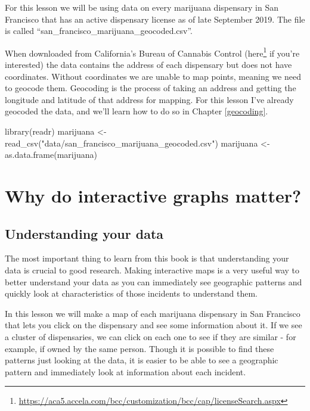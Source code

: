 \documentclass[
  a4paper,
]{krantz}
\makeatletter
\newenvironment{Shaded}{\begin{snugshade}}{\end{snugshade}}
\newcommand{\FunctionTok}[1]{\textcolor[rgb]{0,0,0}{#1}}
\newcommand{\NormalTok}[1]{#1}
\newcommand{\OtherTok}[1]{\textcolor[rgb]{0.37,0.37,0.37}{#1}}
\newcommand{\StringTok}[1]{\textcolor[rgb]{0.5,0.5,0.5}{#1}}
\renewcommand{\href}[2]{#2\footnote{\url{#1}}}
\newenvironment{kframe}{%
\medskip{}
\setlength{\fboxsep}{.8em}
 \def\at@end@of@kframe{}%
 \ifinner\ifhmode%
  \def\at@end@of@kframe{\end{minipage}}%
  \begin{minipage}{\columnwidth}%
 \fi\fi%
 \def\FrameCommand##1{\hskip\@totalleftmargin \hskip-\fboxsep
 \colorbox{shadecolor}{##1}\hskip-\fboxsep
     \hskip-\linewidth \hskip-\@totalleftmargin \hskip\columnwidth}%
 \MakeFramed {\advance\hsize-\width
   \@totalleftmargin\z@ \linewidth\hsize
   \@setminipage}}%
 {\par\unskip\endMakeFramed%
 \at@end@of@kframe}
\renewenvironment{Shaded}{\begin{kframe}}{\end{kframe}}
\makeatother
\begin{document}
For this lesson we will be using data on every marijuana
dispensary in San Francisco that has an active dispensary
license as of late September 2019. The file is called
``san\_francisco\_marijuana\_geocoded.csv''.

When downloaded from California's Bureau of Cannabis Control
(\href{https://aca5.accela.com/bcc/customization/bcc/cap/licenseSearch.aspx}{here}
if you're interested) the data contains the address of each
dispensary but does not have coordinates. Without
coordinates we are unable to map points, meaning we need to
geocode them. Geocoding is the process of taking an address
and getting the longitude and latitude of that address for
mapping. For this lesson I've already geocoded the data, and
we'll learn how to do so in Chapter \ref{geocoding}.

\begin{Shaded}
\begin{Highlighting}[]
\FunctionTok{library}\NormalTok{(readr)}
\NormalTok{marijuana }\OtherTok{\textless{}{-}} \FunctionTok{read\_csv}\NormalTok{(}\StringTok{"data/san\_francisco\_marijuana\_geocoded.csv"}\NormalTok{)}
\NormalTok{marijuana }\OtherTok{\textless{}{-}} \FunctionTok{as.data.frame}\NormalTok{(marijuana)}
\end{Highlighting}
\end{Shaded}

\hypertarget{why-do-interactive-graphs-matter}{%
\section{Why do interactive graphs
matter?}\label{why-do-interactive-graphs-matter}}

\hypertarget{understanding-your-data}{%
\subsection{Understanding your
data}\label{understanding-your-data}}

The most important thing to learn from this book is that
understanding your data is crucial to good research. Making
interactive maps is a very useful way to better understand
your data as you can immediately see geographic patterns and
quickly look at characteristics of those incidents to
understand them.

In this lesson we will make a map of each marijuana
dispensary in San Francisco that lets you click on the
dispensary and see some information about it. If we see a
cluster of dispensaries, we can click on each one to see if
they are similar - for example, if owned by the same person.
Though it is possible to find these patterns just looking at
the data, it is easier to be able to see a geographic
pattern and immediately look at information about each
incident.
\end{document}

